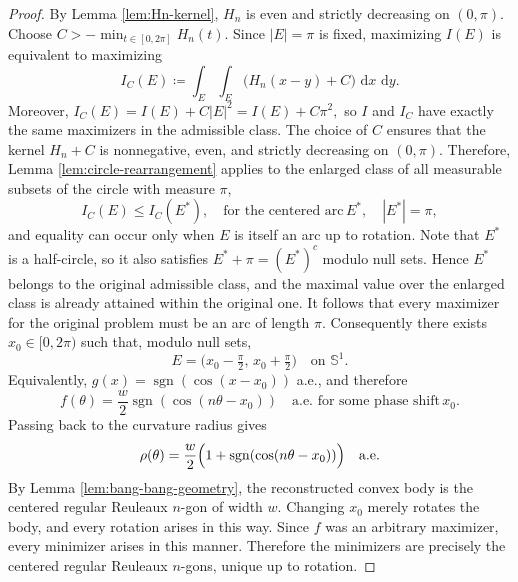 \documentclass[10pt,a4paper]{amsart}
\newcommand{\dd}{\,\mathrm{d}}
\begin{document}
\begin{proof}
By Lemma \ref{lem:Hn-kernel}, $H_n$ is even and strictly decreasing on $(0,\pi)$.
Choose $C> -\min_{t\in[0,2\pi]}H_n(t)$. Since $|E|=\pi$ is fixed, maximizing $I(E)$ is equivalent to maximizing
\[
I_C(E)\coloneqq \int_E\int_E \bigl(H_n(x-y)+C\bigr)\,\dd x\,\dd y.
\]
Moreover,
\(
I_C(E)=I(E)+C|E|^2=I(E)+C\pi^2,
\)
so $I$ and $I_C$ have exactly the same maximizers in the admissible class. The choice of $C$ ensures that the kernel $H_n+C$ is nonnegative, even, and strictly decreasing on $(0,\pi)$. Therefore, Lemma \ref{lem:circle-rearrangement} applies to the enlarged class of all measurable subsets of the circle with measure $\pi$,
\[
I_C(E)\le I_C(E^*), \quad \text{for the centered arc} \, E^*, \quad |E^*|=\pi,
\]
and equality can occur only when $E$ is itself an arc up to rotation.
Note that $E^*$ is a half-circle, so it also satisfies
\(
E^*+\pi=(E^*)^c
\)
modulo null sets. Hence $E^*$ belongs to the original admissible class, and the maximal value over the enlarged class is already attained within the original one. It follows that every maximizer for the original problem must be an arc of length $\pi$. Consequently there exists $x_0\in[0,2\pi)$ such that, modulo null sets,
\[
E=\bigl(x_0-\tfrac{\pi}{2},\,x_0+\tfrac{\pi}{2}\bigr)
\quad\text{on} \, \, \mathbb{S}^1.
\]
Equivalently,
\(
g(x)=\operatorname{sgn}(\cos(x-x_0))
\)
a.e., and therefore
\[
f(\theta)=\frac w2\operatorname{sgn}(\cos(n\theta-x_0))\quad\text{a.e. for some phase shift} \, x_0.
\]
Passing back to the curvature radius gives
\[
\rho(\theta)=\frac w2\Bigl(1+\operatorname{sgn}(\cos(n\theta-x_0))\Bigr)
\quad\text{a.e.}
\]
By Lemma \ref{lem:bang-bang-geometry}, the reconstructed convex body is the centered regular Reuleaux $n$-gon of width $w$. Changing $x_0$ merely rotates the body, and every rotation arises in this way. Since $f$ was an arbitrary maximizer, every minimizer arises in this manner. Therefore the minimizers are precisely the centered regular Reuleaux $n$-gons, unique up to rotation.
\end{proof}
\end{document}

